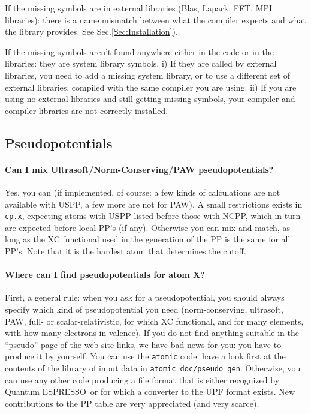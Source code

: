 \documentclass[12pt,a4paper]{article}
\def\qe{{\sc Quantum ESPRESSO}}
\begin{document}
If the missing symbols are in external libraries (Blas, Lapack, FFT,
MPI libraries): 
there is a name mismatch between what the compiler expects and what the
library provides. See Sec.\ref{Sec:Installation}).

If the missing symbols aren't found anywhere either in the code or in the
libraries: they are system library symbols. i) If they are called by external 
libraries, you need to add a missing system library, or to use a different 
set of external libraries, compiled with the same compiler you are using. 
ii) If you are using no external libraries and still getting missing symbols, 
your compiler and compiler libraries are not correctly installed.

\subsection{Pseudopotentials}

\paragraph{Can I mix Ultrasoft/Norm-Conserving/PAW pseudopotentials?}

Yes, you can (if implemented, of course: a few kinds of calculations
are not available with USPP, a few more are not for PAW). A small
restrictions exists in \texttt{cp.x}, expecting atoms with USPP listed before 
those with NCPP, which in turn are expected before local PP's (if any).
Otherwise you can mix and match, as long as the XC functional used in 
the generation of the PP is the same for all PP's. Note that 
it is the hardest atom that determines the cutoff.

\paragraph{Where can I find pseudopotentials for atom X?}

First, a general rule: when you ask for a pseudopotential, you should
always specify which kind of pseudopotential you need (norm-conserving,
ultrasoft, PAW, full- or scalar-relativistic, for which XC functional,
and for many elements, with how many electrons in valence). 
If you do not find anything suitable in the ``pseudo'' page of the web 
site links, we have bad news for you: you have to produce it by yourself. 
You can use the \texttt{atomic} code: have a look first at the contents
of the library of input data in \texttt{atomic\_doc/pseudo\_gen}.
Otherwise, you can use any other code producing a file format that is either
recognized by \qe\ or for which a converter to the UPF format exists. 
New contributions to the PP table are very appreciated (and very scarce).
\end{document}
